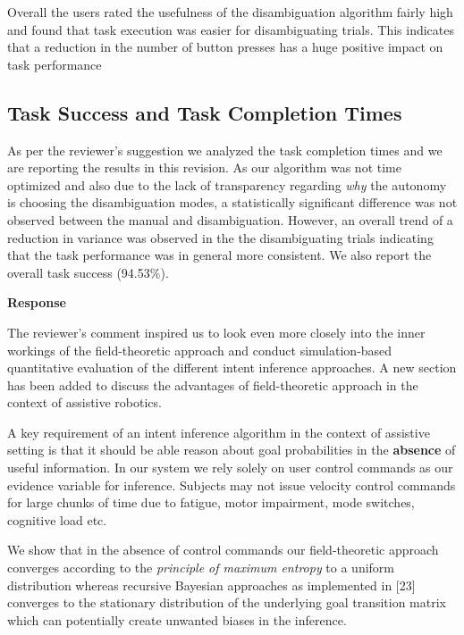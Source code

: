 \documentclass[a4paper,twoside,11pt]{reviewresponse}
\begin{document}
Overall the users rated the usefulness of the disambiguation algorithm fairly high and found that task execution was easier for disambiguating trials. This indicates that a reduction in the number of button presses has a huge positive impact on task performance


\subsection{Task Success and Task Completion Times}
As per the reviewer's suggestion we analyzed the task completion times and we are reporting the results in this revision. As our algorithm was not time optimized and also due to the lack of transparency regarding \textit{why} the autonomy is choosing the disambiguation modes, a statistically significant difference was not observed between the manual and disambiguation. However, an overall trend of a reduction in variance was observed in the the disambiguating trials indicating that the task performance was in general more consistent. We also report the overall task success (94.53$\%$). 


\textbf{Response}

The reviewer's comment inspired us to look even more closely into the inner workings of the field-theoretic approach and conduct simulation-based quantitative evaluation of the different intent inference approaches. 
A new section has been added to discuss the advantages of field-theoretic approach in the context of assistive robotics. 

A key requirement of an intent inference algorithm in the context of assistive setting is that it should be able reason about goal probabilities in the \textbf{absence} of useful information. In our system we rely solely on user control commands as our evidence variable for inference. Subjects may not issue velocity control commands for large chunks of time due to fatigue, motor impairment, mode switches, cognitive load etc. 

We show that in the absence of control commands our field-theoretic approach converges according to the \textit{principle of maximum entropy} to a uniform distribution whereas recursive Bayesian approaches as implemented in [23] converges to the stationary distribution of the underlying goal transition matrix which can potentially create unwanted biases in the inference. 
\end{document}
